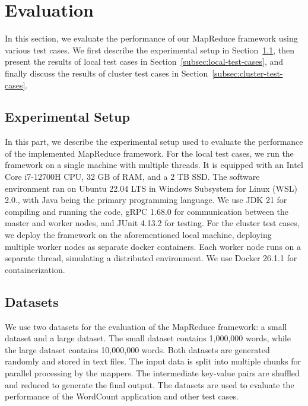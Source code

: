\section{Evaluation}
\label{sec:evaluation}

In this section, we evaluate the performance of our MapReduce framework using various test cases. We first describe the experimental setup in Section~\ref{subsec:experimental-setup}, then present the results of local test cases in Section~\ref{subsec:local-test-cases}, and finally discuss the results of cluster test cases in Section~\ref{subsec:cluster-test-cases}.

\subsection{Experimental Setup}
\label{subsec:experimental-setup}

In this part, we describe the experimental setup used to evaluate the performance of the implemented MapReduce framework. For the local test cases, we run the framework on a single machine with multiple threads. It is equipped with an Intel Core i7-12700H CPU, 32 GB of RAM, and a 2 TB SSD. The software environment ran on Ubuntu 22.04 LTS in Windows Subsystem for Linux (WSL) 2.0., with Java being the primary programming language. We use JDK 21 for compiling and running the code, gRPC 1.68.0 for communication between the master and worker nodes, and JUnit 4.13.2 for testing. For the cluster test cases, we deploy the framework on the aforementioned local machine, deploying multiple worker nodes as separate docker containers. Each worker node runs on a separate thread, simulating a distributed environment. We use Docker 26.1.1 for containerization.

\subsection{Datasets}

We use two datasets for the evaluation of the MapReduce framework: a small dataset and a large dataset. The small dataset contains 1,000,000 words, while the large dataset contains 10,000,000 words. Both datasets are generated randomly and stored in text files. The input data is split into multiple chunks for parallel processing by the mappers. The intermediate key-value pairs are shuffled and reduced to generate the final output. The datasets are used to evaluate the performance of the WordCount application and other test cases.

